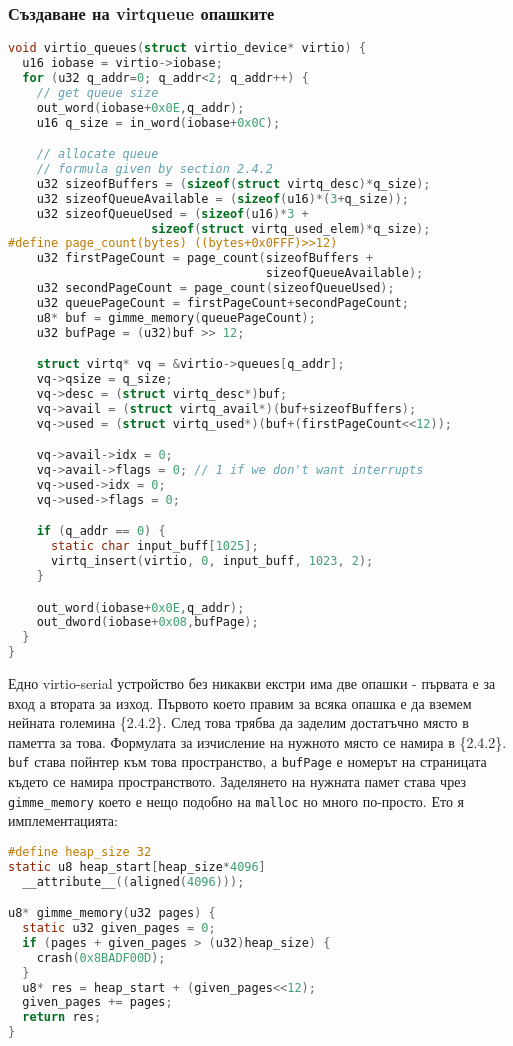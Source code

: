 \subsubsection{Създаване на virtqueue опашките}
\begin{lstlisting}[language=C]
void virtio_queues(struct virtio_device* virtio) {
  u16 iobase = virtio->iobase;
  for (u32 q_addr=0; q_addr<2; q_addr++) {
    // get queue size
    out_word(iobase+0x0E,q_addr);
    u16 q_size = in_word(iobase+0x0C);

    // allocate queue
    // formula given by section 2.4.2
    u32 sizeofBuffers = (sizeof(struct virtq_desc)*q_size);
    u32 sizeofQueueAvailable = (sizeof(u16)*(3+q_size));
    u32 sizeofQueueUsed = (sizeof(u16)*3 +
                    sizeof(struct virtq_used_elem)*q_size);
#define page_count(bytes) ((bytes+0x0FFF)>>12)
    u32 firstPageCount = page_count(sizeofBuffers +
                                    sizeofQueueAvailable);
    u32 secondPageCount = page_count(sizeofQueueUsed);
    u32 queuePageCount = firstPageCount+secondPageCount;
    u8* buf = gimme_memory(queuePageCount);
    u32 bufPage = (u32)buf >> 12;

    struct virtq* vq = &virtio->queues[q_addr];
    vq->qsize = q_size;
    vq->desc = (struct virtq_desc*)buf;
    vq->avail = (struct virtq_avail*)(buf+sizeofBuffers);
    vq->used = (struct virtq_used*)(buf+(firstPageCount<<12));

    vq->avail->idx = 0;
    vq->avail->flags = 0; // 1 if we don't want interrupts
    vq->used->idx = 0;
    vq->used->flags = 0;

    if (q_addr == 0) {
      static char input_buff[1025];
      virtq_insert(virtio, 0, input_buff, 1023, 2);
    }

    out_word(iobase+0x0E,q_addr);
    out_dword(iobase+0x08,bufPage);
  }
}
\end{lstlisting}
Едно virtio-serial устройство без никакви екстри има две опашки - първата е за вход а втората за изход. Първото което правим за всяка опашка е да вземем нейната големина \{2.4.2\}. След това трябва да заделим достатъчно място в паметта за това. Формулата за изчисление на нужното място се намира в \{2.4.2\}. {\tt buf} става пойнтер към това пространство, а {\tt bufPage} е номерът на страницата където се намира пространството. Заделянето на нужната памет става чрез {\tt gimme\_memory} което е нещо подобно на {\tt malloc} но много по-просто. Ето я имплементацията:
\begin{lstlisting}[language=C]
#define heap_size 32
static u8 heap_start[heap_size*4096]
  __attribute__((aligned(4096)));

u8* gimme_memory(u32 pages) {
  static u32 given_pages = 0;
  if (pages + given_pages > (u32)heap_size) {
    crash(0x8BADF00D);
  }
  u8* res = heap_start + (given_pages<<12);
  given_pages += pages;
  return res;
}
\end{lstlisting}

